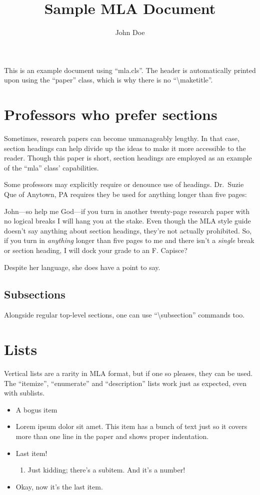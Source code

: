 \documentclass[mla8]{mla}
\title{Sample MLA Document}
\author{John Doe}
\date{\mladate} %
\begin{document}
\begin{paper}

This is an example document using ``mla.cls''.
The header is automatically printed upon using the ``paper'' class,
which is why there is no ``\textbackslash{}maketitle''.

\section{Professors who prefer sections}

Sometimes, research papers can become unmanageably lengthy.
In that case, section headings can help divide up the ideas
to make it more accessible to the reader.
Though this paper is short, section headings are employed
as an example of the ``mla'' class' capabilities.

Some professors may explicitly require or denounce use of headings.
Dr.\ Suzie Que of Anytown, PA requires they be used for anything
longer than five pages:
\begin{blockquote}
John---so help me God---if you turn in another twenty-page research
paper with no logical breaks I will hang you at the stake.
Even though the MLA style guide doesn't say anything about
section headings, they're not actually prohibited.
So, if you turn in \emph{anything} longer than five pages to me
and there isn't a \emph{single} break or section heading,
I will dock your grade to an F.
Capisce? \cite{que2019}
\end{blockquote}
Despite her language, she does have a point to say.

\subsection{Subsections}

Alongside regular top-level sections, one can use
``\textbackslash{}subsection'' commands too.

\section{Lists}

Vertical lists are a rarity in MLA format, but if one so pleases,
they can be used.
The ``itemize'', ``enumerate'' and ``description'' lists
work just as expected, even with sublists.

\begin{itemize}
\item A bogus item
\item Lorem ipsum dolor sit amet.  This item has a bunch of text
	just so it covers more than one line in the paper and shows
	proper indentation.
\item Last item!
\begin{enumerate}
\item Just kidding; there's a subitem.  And it's a number!
\end{enumerate}
\item Okay, now it's the last item.
\end{itemize}


\end{paper}
\end{document}
